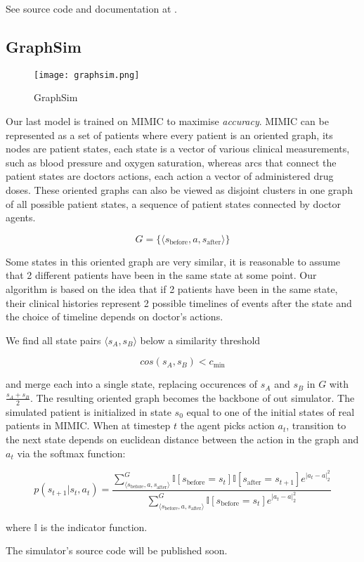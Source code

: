 See source code and documentation at \cite{heartpole}.

\subsection{GraphSim}
\label{sec:graphsim}

\begin{figure}
    \centering
    \texttt{[image: graphsim.png]}
    \caption{GraphSim}
    \label{fig:graphsim}
\end{figure}


Our last model is trained on MIMIC \cite{mimic} to maximise \emph{accuracy}.
MIMIC can be represented as a set of patients where every patient is an oriented graph, its nodes are patient states, each state is a vector of various clinical measurements, such as blood pressure and oxygen saturation, whereas arcs that connect the patient states are doctors actions, each action a vector of administered drug doses.
These oriented graphs can also be viewed as disjoint clusters in one graph of all possible patient states, a sequence of patient states connected by doctor agents.

\begin{equation}
  G = \{ \langle s_\text{before}, a, s_\text{after} \rangle \}
\end{equation}

Some states in this oriented graph are very similar, it is reasonable to assume that 2 different patients have been in the same state at some point. Our algorithm is based on the idea that if 2 patients have been in the same state, their clinical histories represent 2 possible timelines of events after the state and the choice of timeline depends on doctor's actions.

We find all state pairs $\langle s_A, s_B \rangle$ below a similarity threshold

\begin{equation}
  cos(s_A,s_B) < c_\text{min}
\end{equation}

and merge each into a single state, replacing occurences of $s_A$ and $s_B$ in $G$ with $\frac{s_A+s_B}{2}$. 
The resulting oriented graph becomes the backbone of out simulator.
The simulated patient is initialized in state $s_0$ equal to one of the initial states of real patients in MIMIC.
When at timestep $t$ the agent picks action $a_t$, transition to the next state depends on euclidean distance between the action in the graph and $a_t$ via the softmax function:

\begin{equation}
  p(s_{t+1}|s_t, a_t) = \frac{\sum_{\langle s_\text{before}, a, s_\text{after} \rangle}^G \mathbb{I}[s_\text{before} = s_{t}] \mathbb{I}[s_\text{after} = s_{t+1}] e^{|a_t - a|_2^2}}{\sum_{\langle s_\text{before}, a, s_\text{after} \rangle}^G \mathbb{I}[s_\text{before} = s_{t}]  e^{|a_t - a|_2^2}}
\end{equation}

where $\mathbb{I}$ is the indicator function.

The simulator's source code will be published soon.